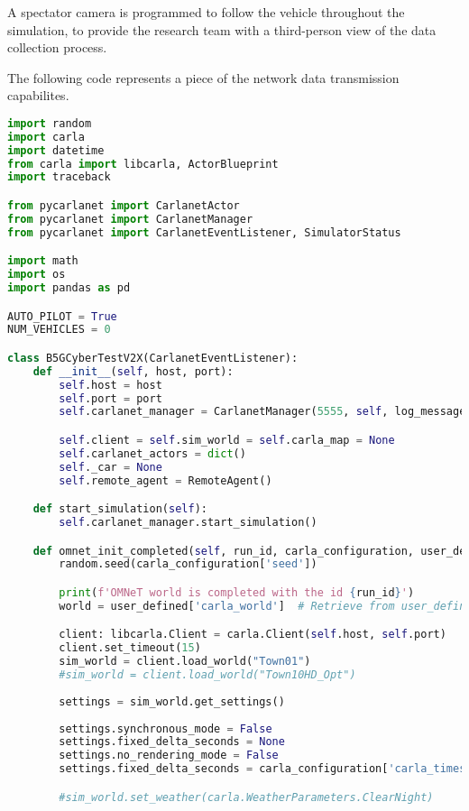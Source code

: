 A spectator camera is programmed to follow the vehicle throughout the simulation, to provide the research team with a third-person view of the data collection process.

The following code represents a piece of the network data transmission capabilites.

\begin{lstlisting}[language=Python, caption={Simple data collection example, now using network simulation capabilities.},label={code:network}]
import random
import carla
import datetime
from carla import libcarla, ActorBlueprint
import traceback

from pycarlanet import CarlanetActor
from pycarlanet import CarlanetManager
from pycarlanet import CarlanetEventListener, SimulatorStatus

import math
import os
import pandas as pd

AUTO_PILOT = True
NUM_VEHICLES = 0

class B5GCyberTestV2X(CarlanetEventListener):
    def __init__(self, host, port):
        self.host = host
        self.port = port
        self.carlanet_manager = CarlanetManager(5555, self, log_messages=True)

        self.client = self.sim_world = self.carla_map = None
        self.carlanet_actors = dict()
        self._car = None
        self.remote_agent = RemoteAgent()

    def start_simulation(self):
        self.carlanet_manager.start_simulation()

    def omnet_init_completed(self, run_id, carla_configuration, user_defined) -> (SimulatorStatus, World):
        random.seed(carla_configuration['seed'])

        print(f'OMNeT world is completed with the id {run_id}')
        world = user_defined['carla_world']  # Retrieve from user_defined

        client: libcarla.Client = carla.Client(self.host, self.port)
        client.set_timeout(15)
        sim_world = client.load_world("Town01")
        #sim_world = client.load_world("Town10HD_Opt")
        
        settings = sim_world.get_settings()
        
        settings.synchronous_mode = False
        settings.fixed_delta_seconds = None
        settings.no_rendering_mode = False
        settings.fixed_delta_seconds = carla_configuration['carla_timestep']

        #sim_world.set_weather(carla.WeatherParameters.ClearNight)


\end{lstlisting}

